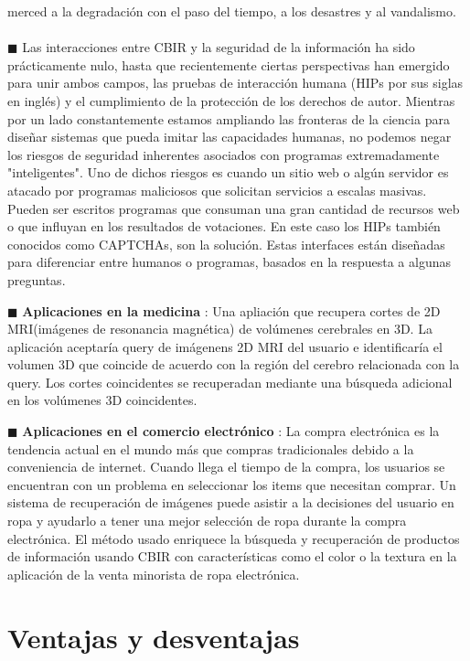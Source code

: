 \documentclass{llncs}
\begin{document}
merced a la degradación con el paso del tiempo, a los desastres y al vandalismo.
\\\\
\noindent $\blacksquare$ Las interacciones entre CBIR y la seguridad de la información ha sido prácticamente nulo, hasta que recientemente ciertas perspectivas 
han emergido  para unir ambos campos, las pruebas de interacción humana (HIPs por sus siglas en inglés) y el cumplimiento de 
la protección de los derechos de autor. Mientras por un lado constantemente estamos ampliando las fronteras de la ciencia para 
diseñar sistemas que pueda imitar las capacidades humanas, no podemos negar los riesgos de seguridad inherentes asociados con 
programas extremadamente "inteligentes". Uno de dichos riesgos es cuando un sitio web o algún servidor es atacado por programas 
maliciosos que solicitan servicios a escalas masivas. Pueden ser escritos programas que consuman una gran cantidad de recursos web o 
que influyan en los resultados de votaciones. En este caso los HIPs también conocidos como CAPTCHAs, son la solución. Estas interfaces 
están diseñadas para diferenciar entre humanos o programas, basados en la respuesta a algunas preguntas.

\noindent $\blacksquare$ \textbf{Aplicaciones en la medicina} :
Una apliaci\'on que recupera cortes de 2D MRI(im\'agenes de resonancia magn\'etica)
de vol\'umenes cerebrales en 3D. La aplicaci\'on aceptar\'ia query de im\'agenens 2D MRI del usuario e identificar\'ia el volumen 3D que coincide
de acuerdo con la  regi\'on del cerebro relacionada con la query. Los cortes coincidentes se recuperadan mediante una b\'usqueda adicional en los vol\'umenes
3D coincidentes.

\noindent $\blacksquare$ \textbf{Aplicaciones en el comercio electr\'onico} :
La compra electr\'onica es la tendencia actual en el mundo m\'as que compras tradicionales debido a la conveniencia de internet. Cuando llega 
el tiempo de la compra, los usuarios se encuentran con un problema en seleccionar los items que necesitan comprar. Un sistema de recuperaci\'on
de im\'agenes puede asistir a la decisiones del usuario en ropa y ayudarlo a tener una mejor selecci\'on de ropa durante la compra electr\'onica.
El m\'etodo usado enriquece la b\'usqueda y recuperaci\'on de productos de informaci\'on usando CBIR con caracter\'isticas como el color o la textura 
en la aplicaci\'on de la venta minorista de ropa electr\'onica.  


\chapter*{Ventajas y desventajas}
\end{document}
